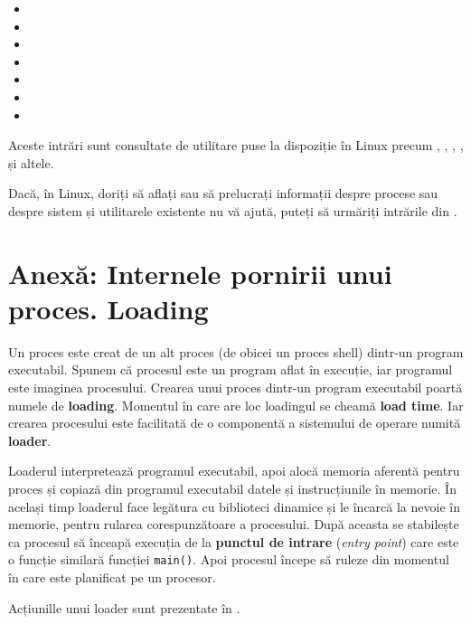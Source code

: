 \begin{itemize}
  \item {}
  \item {}
  \item {}
  \item {}
  \item {}
  \item {}
  \item {}
\end{itemize}

Aceste intrări sunt consultate de utilitare puse la dispoziție în Linux precum
, , , ,  și altele.

\begin{note}
Dacă, în Linux, doriți să aflați sau să prelucrați informații despre
procese sau despre sistem și utilitarele existente nu vă ajută, puteți să
  urmăriți intrările din .
\end{note}

\section{Anexă: Internele pornirii unui proces. Loading}
\label{sec:process:loading}

Un proces este creat de un alt proces (de obicei un proces shell) dintr-un
program executabil. Spunem că procesul este un program aflat în execuție, iar
programul este imaginea procesului. Crearea unui proces dintr-un program
executabil poartă numele de \textbf{loading}. Momentul în care are loc loadingul se
cheamă \textbf{load time}. Iar crearea procesului este facilitată de o componentă a
sistemului de operare numită \textbf{loader}.

Loaderul interpretează programul executabil, apoi alocă memoria aferentă pentru
proces și copiază din programul executabil datele și instrucțiunile în memorie.
În același timp loaderul face legătura cu biblioteci dinamice și le încarcă la
nevoie în memorie, pentru rularea corespunzătoare a procesului. După aceasta se
stabilește ca procesul să înceapă execuția de la \textbf{punctul de intrare} (\textit{entry
point}) care este o funcție similară funcției \texttt{main()}. Apoi procesul începe să ruleze din momentul în care este planificat pe
un procesor.

Acțiunille unui loader sunt prezentate în .


